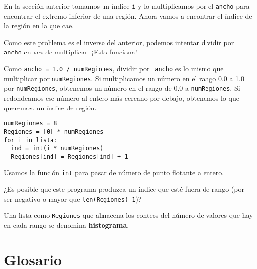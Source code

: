En la sección anterior tomamos un índice \texttt{i} y lo multiplicamos
por el \texttt{ancho} para encontrar el extremo inferior de una región. 
Ahora vamos a encontrar el índice de la región en la que cae.

Como este problema es el inverso del anterior, podemos intentar
dividir por \texttt{ancho} en vez de multiplicar. ¡Esto funciona!

Como \texttt{ancho = 1.0 / numRegiones}, dividir por {\tt
ancho} es lo mismo que multiplicar por \texttt{numRegiones}.  Si 
multiplicamos un número en el rango 0.0 a 1.0 por \texttt{numRegiones}, 
obtenemos un número en el rango de  0.0 a \texttt{numRegiones}.  Si 
redondeamos ese número al entero más cercano por debajo, obtenemos
lo que queremos: un índice de región:

\beforeverb
\begin{verbatim}
numRegiones = 8
Regiones = [0] * numRegiones
for i in lista:
  ind = int(i * numRegiones)
  Regiones[ind] = Regiones[ind] + 1
\end{verbatim}
\afterverb
%
Usamos la función  \texttt{int} para pasar de número de punto flotante
a entero.

¿Es posible que este programa produzca un índice que esté fuera
de rango (por ser negativo o mayor que \texttt{len(Regiones)-1})?

Una lista como  \texttt{Regiones} que almacena los conteos del número
de valores que hay en cada rango se denomina {\bf histograma}.



\section{Glosario}

